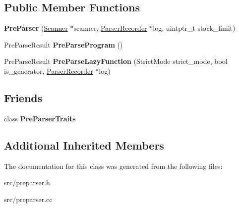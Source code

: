 \subsection*{Public Member Functions}
\begin{DoxyCompactItemize}
\item 
\hypertarget{classv8_1_1internal_1_1_pre_parser_ada03588b3313827a884d227494d6e5b4}{}{\bfseries Pre\+Parser} (\hyperlink{classv8_1_1internal_1_1_scanner}{Scanner} $\ast$scanner, \hyperlink{classv8_1_1internal_1_1_parser_recorder}{Parser\+Recorder} $\ast$log, uintptr\+\_\+t stack\+\_\+limit)\label{classv8_1_1internal_1_1_pre_parser_ada03588b3313827a884d227494d6e5b4}

\item 
\hypertarget{classv8_1_1internal_1_1_pre_parser_afc4b86c8cfff10c15cc9932b96df532f}{}Pre\+Parse\+Result {\bfseries Pre\+Parse\+Program} ()\label{classv8_1_1internal_1_1_pre_parser_afc4b86c8cfff10c15cc9932b96df532f}

\item 
\hypertarget{classv8_1_1internal_1_1_pre_parser_a1e8b24d27f8105c9a1cde7e6eed12233}{}Pre\+Parse\+Result {\bfseries Pre\+Parse\+Lazy\+Function} (Strict\+Mode strict\+\_\+mode, bool is\+\_\+generator, \hyperlink{classv8_1_1internal_1_1_parser_recorder}{Parser\+Recorder} $\ast$log)\label{classv8_1_1internal_1_1_pre_parser_a1e8b24d27f8105c9a1cde7e6eed12233}

\end{DoxyCompactItemize}
\subsection*{Friends}
\begin{DoxyCompactItemize}
\item 
\hypertarget{classv8_1_1internal_1_1_pre_parser_a13cc2d699d49f893ee3824107270498e}{}class {\bfseries Pre\+Parser\+Traits}\label{classv8_1_1internal_1_1_pre_parser_a13cc2d699d49f893ee3824107270498e}

\end{DoxyCompactItemize}
\subsection*{Additional Inherited Members}


The documentation for this class was generated from the following files\+:\begin{DoxyCompactItemize}
\item 
src/preparser.\+h\item 
src/preparser.\+cc\end{DoxyCompactItemize}
